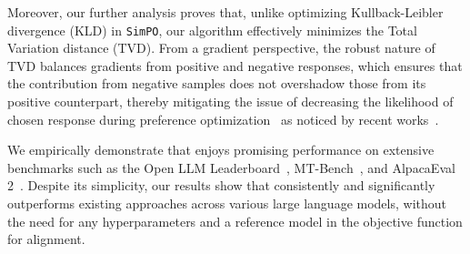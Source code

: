 Moreover, our further analysis proves that, unlike optimizing Kullback-Leibler divergence (KLD) in \texttt{SimPO}, our algorithm effectively minimizes the Total Variation distance (TVD). From a gradient perspective, the robust nature of TVD balances gradients from positive and negative responses, which ensures that the contribution from negative samples does not overshadow those from its positive counterpart, thereby mitigating the issue of decreasing the likelihood of chosen response during preference optimization~ as noticed by recent works~\citep{meng2024simpo,pal2024smaug}.

We empirically demonstrate that \method enjoys promising performance on extensive benchmarks such as the Open LLM Leaderboard~\citep{beeching2023open}, MT-Bench~\citep{zheng2023judging}, and AlpacaEval 2~\citep{li2023alpacaeval}. Despite its simplicity, our results show that \method consistently and significantly outperforms existing approaches across various large language models, without the need for any hyperparameters and a reference model in the objective function for alignment.


